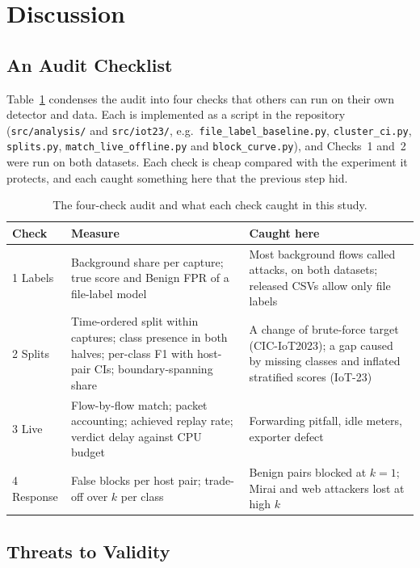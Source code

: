 \section{Discussion}\label{sec:discussion}

\subsection{An Audit Checklist}\label{sec:checklist}

Table~\ref{tab:checklist} condenses the audit into four checks that others can run on their own detector and data. Each is implemented as a script in the repository (\nolinkurl{src/analysis/} and \nolinkurl{src/iot23/}, e.g.\ \nolinkurl{file_label_baseline.py}, \nolinkurl{cluster_ci.py}, \nolinkurl{splits.py}, \nolinkurl{match_live_offline.py} and \nolinkurl{block_curve.py}), and Checks~1 and~2 were run on both datasets. Each check is cheap compared with the experiment it protects, and each caught something here that the previous step hid.

\begin{table}[t]
\centering
\caption{The four-check audit and what each check caught in this study.}
\label{tab:checklist}
\footnotesize
\setlength{\tabcolsep}{3pt}
\begin{tabular}{p{1.0cm}p{3.5cm}p{3.6cm}}
\hline
Check & Measure & Caught here \\
\hline
1 Labels & Background share per capture; true score and Benign FPR of a file-label model & Most background flows called attacks, on both datasets; released CSVs allow only file labels \\
2 Splits & Time-ordered split within captures; class presence in both halves; per-class F1 with host-pair CIs; boundary-spanning share & A change of brute-force target (CIC-IoT2023); a gap caused by missing classes and inflated stratified scores (IoT-23) \\
3 Live & Flow-by-flow match; packet accounting; achieved replay rate; verdict delay against CPU budget & Forwarding pitfall, idle meters, exporter defect \\
4 Response & False blocks per host pair; trade-off over $k$ per class & Benign pairs blocked at $k=1$; Mirai and web attackers lost at high $k$ \\
\hline
\end{tabular}
\end{table}

\subsection{Threats to Validity}\label{sec:threats}

